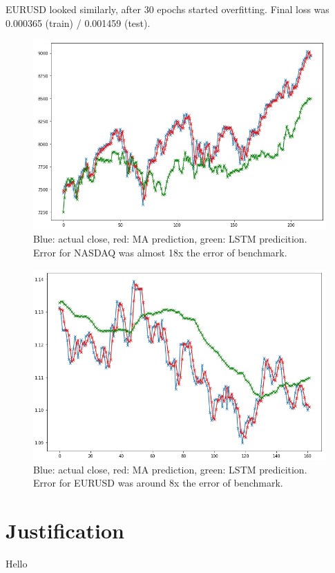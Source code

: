 \documentclass[a4paper,12pt]{article}
\begin{document}
EURUSD looked similarly, after 30 epochs started overfitting. Final loss was 0.000365 (train) / 0.001459 (test).

\begin{figure}[h]
	\centering
	\includegraphics[scale=2.2]{nasdaqVs}
	\caption{Blue: actual close, red: MA prediction, green: LSTM predicition. Error for NASDAQ was almost 18x the error of benchmark.}
\end{figure}

\begin{figure}[h]
	\centering
	\includegraphics[scale=2.2]{eurusdVs}
	\caption{Blue: actual close, red: MA prediction, green: LSTM predicition. Error for EURUSD was around 8x the error of benchmark.}
\end{figure}

\section{Justification}
Hello
\end{document}
